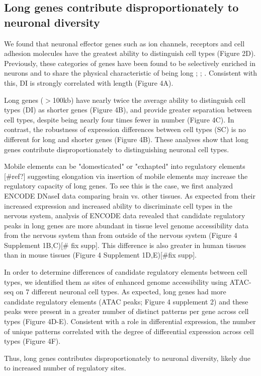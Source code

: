 \subsection{Long genes contribute disproportionately to neuronal diversity}

We found that neuronal effector genes such as ion channels, receptors and cell adhesion molecules have the greatest ability to distinguish cell types (Figure 2D). Previously, these categories of genes have been found to be selectively enriched in neurons and to share the physical characteristic of being long \cite{Sugino_2014}; \cite{Gabel_2015}; \cite{Zylka_2015}. Consistent with this, DI is strongly correlated with length (Figure 4A).

Long genes ($\gt$100kb) have nearly twice the average ability to distinguish cell types (DI) as shorter genes (Figure 4B), and provide greater separation between cell types, despite being nearly four times fewer in number (Figure 4C). In contrast, the robustness of expression differences between cell types (SC) is no different for long and shorter genes (Figure 4B). These analyses show that long genes contribute disproportionately to distinguishing neuronal cell types. 

Mobile elements can be "domesticated" or "exhapted" into regulatory elements [#ref?] suggesting elongation via insertion of mobile elements may increase the regulatory capacity of long genes. To see this is the case, we first analyzed ENCODE DNaseI data comparing brain vs. other tissues. As expected from their increased expression and increased ability to discriminate cell types in the nervous system, analysis of ENCODE data revealed that candidate regulatory peaks in long genes are more abundant in tissue level genome accessibility data from the nervous system than from outside of the nervous system (Figure 4 Supplement 1B,C)[# fix supp]. This difference is also greater in human tissues than in mouse tissues (Figure 4 Supplement 1D,E)[#fix supp].

In order to determine differences of candidate regulatory elements between cell types, we identified them as sites of enhanced genome accessibility using ATAC-seq \cite{Buenrostro_2013} on 7 different neuronal cell types. As expected, long genes had more candidate regulatory elements (ATAC peaks; Figure 4 supplement 2) and these peaks were present in a greater number of distinct patterns per gene across cell types (Figure 4D-E). Consistent with a role in differential expression, the number of unique patterns correlated with the degree of differential expression across cell types (Figure 4F).

Thus, long genes contributes disproportionately to neuronal diversity, likely due to increased number of regulatory sites. 


